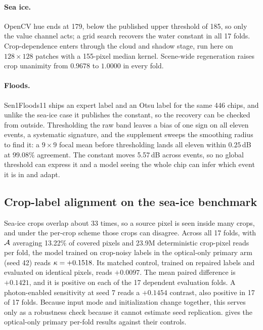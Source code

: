 \paragraph{Sea ice.} OpenCV hue ends at 179, below the published upper threshold of
185, so only the value channel acts; a grid search recovers the water constant in all
17 folds. Crop-dependence enters through the cloud and shadow stage, run here on
$128 \times 128$ patches with a 155-pixel median kernel. Scene-wide regeneration
raises crop unanimity from $0.9678$ to $1.0000$ in every fold.

\paragraph{Floods.} Sen1Floods11 ships an expert label and an Otsu label for the
same 446 chips, and unlike the sea-ice case it publishes the constant, so the
recovery can be checked from outside. Thresholding the raw band leaves a bias of one
sign on all eleven events, a systematic signature, and the supplement
sweeps the smoothing radius to find it: a $9 \times 9$ focal mean before thresholding
lands all eleven within $0.25$\,dB at $99.08\%$ agreement. The constant moves 5.57\,dB
across events, so no global threshold can express it and a model seeing the whole
chip can infer which event it is in and adapt.

\subsection{Crop-label alignment on the sea-ice benchmark}

Sea-ice crops overlap about 33 times, so a source pixel is seen inside many crops,
and under the per-crop scheme those crops can disagree. Across all 17 folds, with
$\mathcal{A}$ averaging 13.22\% of covered pixels and 23.9M deterministic crop-pixel reads per fold, the model
trained on crop-noisy labels in the optical-only primary arm (seed 42) reads
$\kappa = +0.1518$. Its matched control, trained on repaired labels and evaluated on
identical pixels, reads $+0.0097$. The mean paired difference is
$\mathbf{+0.1421}$, and it is positive on each of the 17 dependent evaluation
folds. A photon-enabled sensitivity at seed 7 reads a $+0.1454$ contrast, also
positive in 17 of 17 folds. Because input mode and initialization change together,
this serves only as a robustness check because it cannot estimate seed replication.
 gives
the optical-only primary per-fold results against their controls.


